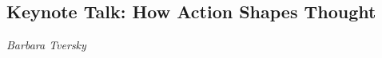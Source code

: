 \documentclass[../booklet.tex]{subfiles}
\begin{document}
\subsection[Keynote Talk: How Action Shapes Thought. {\it Barbara Tversky}]{Keynote Talk: How Action Shapes Thought}

\begin{center}
  {\it Barbara Tversky}
\end{center}



% 
\end{document}
